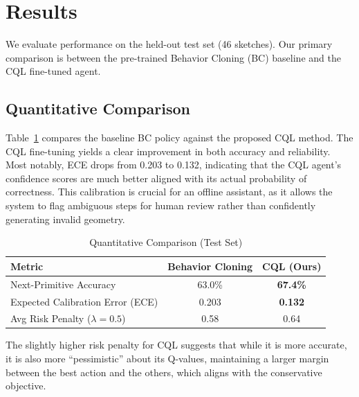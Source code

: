 \documentclass[conference]{IEEEtran}
\begin{document}
\section{Results}
We evaluate performance on the held-out test set (46 sketches). Our primary comparison is between the pre-trained Behavior Cloning (BC) baseline and the CQL fine-tuned agent.

\subsection{Quantitative Comparison}
Table~\ref{tab:metrics} compares the baseline BC policy against the proposed CQL method. The CQL fine-tuning yields a clear improvement in both accuracy and reliability. Most notably, ECE drops from 0.203 to 0.132, indicating that the CQL agent's confidence scores are much better aligned with its actual probability of correctness. This calibration is crucial for an offline assistant, as it allows the system to flag ambiguous steps for human review rather than confidently generating invalid geometry.

\begin{table}[H]
\centering
\caption{Quantitative Comparison (Test Set)}
\label{tab:metrics}
\begin{tabular}{lcc}
\toprule
Metric & Behavior Cloning & \textbf{CQL (Ours)} \\
\midrule
Next-Primitive Accuracy & 63.0\% & \textbf{67.4\%} \\
Expected Calibration Error (ECE) & 0.203 & \textbf{0.132} \\
Avg Risk Penalty ($\lambda{=}0.5$) & 0.58 & 0.64 \\
\bottomrule
\end{tabular}
\end{table}

The slightly higher risk penalty for CQL suggests that while it is more accurate, it is also more ``pessimistic'' about its Q-values, maintaining a larger margin between the best action and the others, which aligns with the conservative objective.
\end{document}
